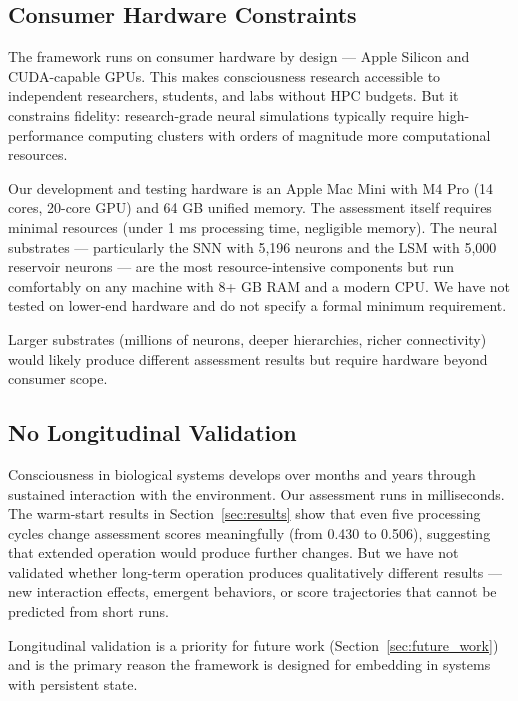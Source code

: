 \subsection{Consumer Hardware Constraints}

The framework runs on consumer hardware by design --- Apple Silicon and CUDA-capable GPUs. This makes consciousness research accessible to independent researchers, students, and labs without HPC budgets. But it constrains fidelity: research-grade neural simulations typically require high-performance computing clusters with orders of magnitude more computational resources.

Our development and testing hardware is an Apple Mac Mini with M4 Pro (14 cores, 20-core GPU) and 64 GB unified memory. The assessment itself requires minimal resources (under 1 ms processing time, negligible memory). The neural substrates --- particularly the SNN with 5,196 neurons and the LSM with 5,000 reservoir neurons --- are the most resource-intensive components but run comfortably on any machine with 8+ GB RAM and a modern CPU. We have not tested on lower-end hardware and do not specify a formal minimum requirement.

Larger substrates (millions of neurons, deeper hierarchies, richer connectivity) would likely produce different assessment results but require hardware beyond consumer scope.

\subsection{No Longitudinal Validation}

Consciousness in biological systems develops over months and years through sustained interaction with the environment. Our assessment runs in milliseconds. The warm-start results in Section~\ref{sec:results} show that even five processing cycles change assessment scores meaningfully (from 0.430 to 0.506), suggesting that extended operation would produce further changes. But we have not validated whether long-term operation produces qualitatively different results --- new interaction effects, emergent behaviors, or score trajectories that cannot be predicted from short runs.

Longitudinal validation is a priority for future work (Section~\ref{sec:future_work}) and is the primary reason the framework is designed for embedding in systems with persistent state.
